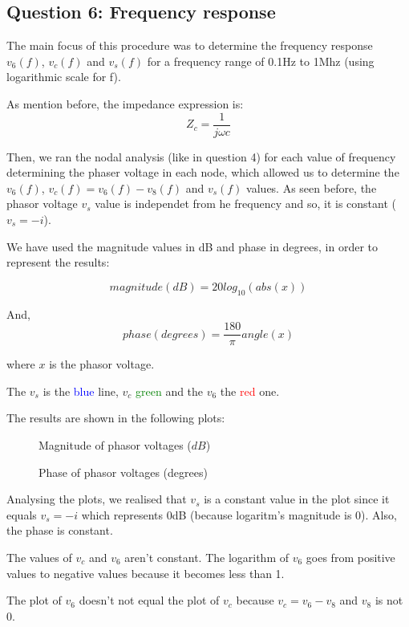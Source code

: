 \subsection{Question 6: Frequency response}
The main focus of this procedure was to determine the frequency response $v_6(f)$, $v_c(f)$ and $v_s(f)$ for a frequency range of 0.1Hz to 1Mhz (using logarithmic scale for f). \par
As mention before, the impedance expression is:
\begin{equation}
     Z_c = \frac{1}{j\omega c}
\end{equation}\par
Then, we ran the nodal analysis (like in question 4) for each value of frequency determining the phaser voltage in each node, which allowed us to determine the $v_6(f)$, $v_c(f) = v_6(f) - v_8(f)$ and $v_s(f)$ values. As seen before, the phasor voltage $v_s$ value is independet from he frequency and so, it is constant ($v_s = -i$). \par
We have used the magnitude values in dB and phase in degrees, in order to represent the results:\par
\begin{equation}
     magnitude (dB) = 20log_{10}(abs(x))
\end{equation}\par
And,
\begin{equation}
     phase (degrees) = \frac{180}{\pi}angle(x)
\end{equation}\par
where $x$ is the phasor voltage.\par
The $v_s$ is the \textcolor{blue}{blue} line, $v_c$ \textcolor{green}{green} and the $v_6$ the \textcolor{red}{red} one.\par
The results are shown in the following plots: \par

\begin{figure}[H] \centering
\caption{Magnitude of phasor voltages ($dB$)}
\label{fig:plot6}
\end{figure}

\begin{figure}[H] \centering
\caption{Phase of phasor voltages (degrees)}
\label{fig:plot7}
\end{figure}

Analysing the plots, we realised that $v_s$ is a constant value in the plot since it equals $v_s= -i$ which represents 0dB (because logaritm's magnitude is 0). Also, the phase is constant. \par
The values of $v_c$ and $v_6$ aren't constant. The logarithm of $v_6$ goes from positive values to negative values because it becomes less than 1. \par
The plot of $v_6$ doesn't not equal the plot of $v_c$ because $v_c=v_6 - v_8$ and $v_8$ is not 0.





